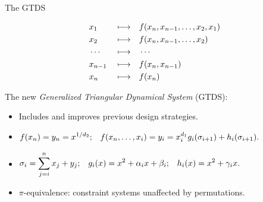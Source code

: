 \documentclass[beamer={10pt,xcolor=dvipsnames},target=mst]{thud}
\begin{document}
\begin{frame}{The GTDS~\cite{RoyS2022}}
  \begin{center}
    \begin{align*}
      & x_{1}    && \longmapsto && \call{f}{x_{n}, x_{n-1}, \dots, x_{2}, x_{1}}  \\
      & x_{2}    && \longmapsto && \call{f}{x_{n}, x_{n-1}, \dots, x_{2}}         \\
      & \cdots   && \longmapsto && \cdots                                         \\
      & x_{n-1}  && \longmapsto && \call{f}{x_{n}, x_{n-1}}                       \\
      & x_{n}    && \longmapsto && \call{f}{x_{n}}                                \\
    \end{align*}
  \end{center}

  The new \emph{Generalized Triangular Dynamical System} (GTDS):
  \begin{itemize}
    \item Includes and improves previous design strategies. 
    \item \(\begin{aligned}
        \call{f}{x_n} = y_n = x^{1/d_2}; && \call{f}{x_n, \dots, x_i} = y_i = x_i^{d_1}\call{g_i}{\sigma_{i+1}} + \call{h_i}{\sigma_{i+1}}.
    \end{aligned}\)
    \item \(\begin{aligned}
            & \sigma_{i} = \sum_{j=i}^{n}{x_j + y_j};
            && \call{g_i}{x} = x^2 + \alpha_{i}x + \beta_{i};
            && \call{h_i}{x} = x^2 + \gamma_{i}x.
          \end{aligned}\)
    \item \(\pi \)-equivalence: constraint systems unaffected by permutations.
  \end{itemize}
\end{frame}
\end{document}
